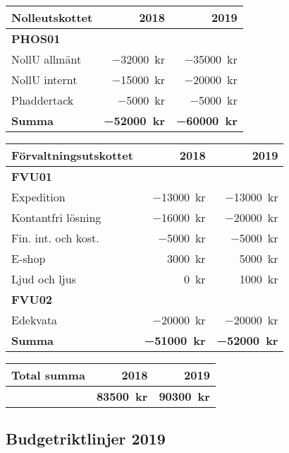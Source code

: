 \documentclass[10pt]{article}
\begin{document}
    \begin{tabularx}{10cm}{X r r}
        \textbf{\large Nolleutskottet} & \textbf{2018} & \textbf{2019} \\
        \hline
        \textbf{PHOS01} \\
        NollU allmänt & \SI{-32000}{kr} & \SI{-35000}{kr} \\
        NollU internt & \SI{-15000}{kr} & \SI{-20000}{kr} \\
        Phaddertack & \SI{-5000}{kr} & \SI{-5000}{kr} \\
        \hline
        \textbf{Summa} & \textbf{\SI{-52000}{kr}} & \textbf{\SI{-60000}{kr}} \\
    \end{tabularx}
    
    \begin{tabularx}{10cm}{X r r}
        \textbf{\large Förvaltningsutskottet} & \textbf{2018} & \textbf{2019} \\
        \hline
        \textbf{FVU01} \\
        Expedition & \SI{-13000}{kr} & \SI{-13000}{kr} \\
        Kontantfri lösning & \SI{-16000}{kr} & \SI{-20000}{kr} \\
        Fin. int. och kost. & \SI{-5000}{kr} & \SI{-5000}{kr} \\
        E-shop & \SI{3000}{kr} & \SI{5000}{kr} \\
        Ljud och ljus & \SI{0}{kr} & \SI{1000}{kr}\\
        \textbf{FVU02} \\
        Edekvata & \SI{-20000}{kr} & \SI{-20000}{kr} \\
        \hline
        \textbf{Summa} & \textbf{\SI{-51000}{kr}} & \textbf{\SI{-52000}{kr}} \\
    \end{tabularx}
    
    \begin{tabularx}{10cm}{X r r}
        \textbf{\large Total summa} & \textbf{2018} & \textbf{2019} \\
        \hline
         & \textbf{\SI{83500}{kr}} & \textbf{\SI{90300}{kr}} \\
    \end{tabularx}
    
    
    \newpage
    \subsection*{Budgetriktlinjer 2019}
    
\end{document}
